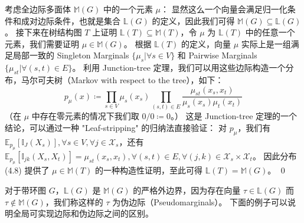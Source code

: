 \analysis[证明]
考虑全边际多面体 $\mathbb{M}(G)$ 中的一个元素 $\mu$：
显然这么一个向量会满足归一化条件和成对边际条件，也就是集合 $\mathbb{L}(G)$ 的定义，因此我们可得 $\mathbb{M}(G) \subseteq \mathbb{L}(G)$。
接下来在树结构图 $T$ 上证明 $\mathbb{L}(T) \subseteq \mathbb{M}(T)$，令 $\mu$ 为 $\mathbb{L}(T)$ 中的任意一个元素，我们需要证明 $\mu \in \mathbb{M}(G)$。
根据 $\mathbb{L}(T)$ 的定义，向量 $\mu$ 实际上是一组满足局部一致的 Singleton Marginals $\{\mu_s| \forall s \in V\}$ 和 Pairwise Marginals $\{\mu_{st}| \forall (s, t) \in E\}$。
利用 Junction-tree 定理，我们可以用这些边际构造一个分布，马尔可夫树（Markov with respect to the tree），如下：
\begin{equation}
    p_{\mu}(x) \coloneqq \prod_{s \in V}\mu_s(x_s)\prod_{(s, t) \in E}\frac{\mu_{st}(x_s, x_t)}{\mu_s(x_s)\mu_t(x_t)}
\end{equation}
（在 $\mu$ 中存在零元素的情况下我们取 $0/0 \coloneqq 0$。）
这是 Junction-tree 定理的一个结论，可以通过一种 "Leaf-stripping" 的归纳法直接验证：
对 $p_{\mu}$，我们有 $\mathbb{E}_{p_{\mu}}[\mathbb{I}_J(X_s)], \forall s \in V, \forall j \in \mathcal{X}_s$，还有 $\mathbb{E}_{p_{\mu}}[\mathbb{I}_{jk}(X_s, X_t)] = \mu_{st}(x_s, x_t), \forall (s, t) \in E, \forall (j, k) \in \mathcal{X}_s \times \mathcal{X}_t$。
因此分布 (4.8) 提供了 $\mu \in \mathbb{M}(T)$ 的一种构造性证明，至此可得 $\mathbb{L}(T) = \mathbb{M}(G)$。
\qed

对于带环图 $G$，$\mathbb{L}(G)$ 是 $\mathbb{M}(G)$ 的严格外边界，因为存在向量 $\tau \in \mathbb{L}(G)$ 而 $\tau \notin \mathbb{M}(G)$，我们称这样的 $\tau$ 为伪边际（Pseudomarginals）。
下面的例子可以说明全局可实现边际和伪边际之间的区别。

